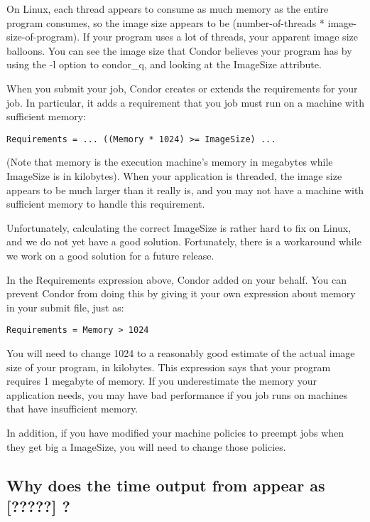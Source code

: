 On Linux, each thread appears to consume as much memory as the entire
program consumes, so the image size appears to be (number-of-threads *
image-size-of-program). If your program uses a lot of threads, your
apparent image size balloons. You can see the image size that Condor
believes your program has by using the -l option to condor\_q, and
looking at the ImageSize attribute.

When you submit your job, Condor creates or extends the requirements
for your job. In particular, it adds a requirement that you job must
run on a machine with sufficient memory:

\footnotesize
\begin{verbatim}
Requirements = ... ((Memory * 1024) >= ImageSize) ...
\end{verbatim}
\normalsize

(Note that memory is the execution machine's memory in megabytes while
ImageSize is in kilobytes). When your application is threaded, the
image size appears to be much larger than it really is, and you may not
have a machine with sufficient memory to handle this requirement.

Unfortunately, calculating the correct ImageSize is rather hard to fix
on Linux, and we do not yet have a good solution. Fortunately, there
is a workaround while we work on a good solution for a future
release.

In the Requirements expression above, Condor added  on your behalf. You can prevent Condor from doing this by
giving it your own expression about memory in your submit file, just
as:

\begin{verbatim}
Requirements = Memory > 1024
\end{verbatim}

You will need to change 1024 to a reasonably good estimate of the actual
image size of your program, in kilobytes. This expression says that
your program requires 1 megabyte of memory. If you underestimate the
memory your application needs, you may have bad performance if you job
runs on machines that have insufficient memory.

In addition, if you have modified your machine policies to preempt
jobs when they get big a ImageSize, you will need to change those
policies.

\subsection*{Why does the time output from  appear
as [?????] ? }

